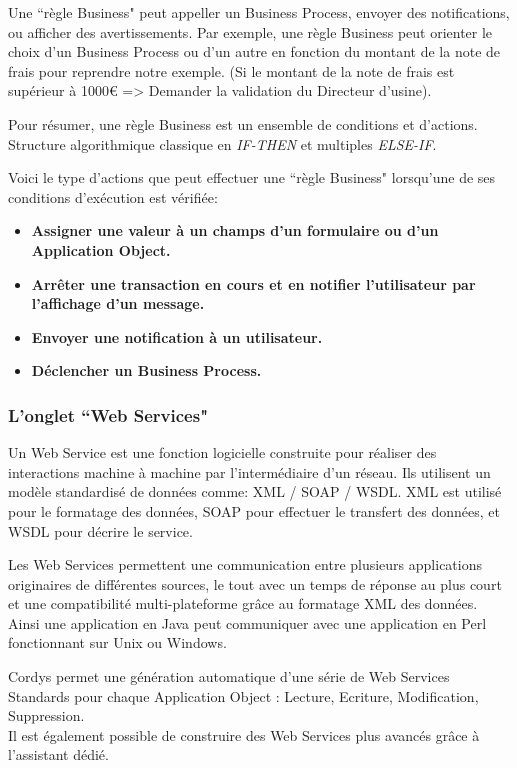 Une ``règle Business" peut appeller un Business Process, envoyer des notifications, ou afficher des avertissements. Par exemple, une règle Business peut orienter le choix d'un Business Process ou d'un autre en fonction du montant de la note de frais pour reprendre notre exemple. (Si le montant de la note de frais est supérieur à 1000€ => Demander la validation du Directeur d'usine). 

Pour résumer, une règle Business est un ensemble de conditions et d'actions. Structure algorithmique classique en \emph{IF-THEN } et multiples \emph{ELSE-IF}.


Voici le type d'actions que peut effectuer une ``règle Business" lorsqu'une de ses conditions d'exécution est vérifiée:

\begin{itemize}\itemsep7pt
	 \item \textbf{Assigner une valeur à un champs d'un formulaire ou d'un Application Object.}
	 	 
	 \item \textbf{Arrêter une transaction en cours et en notifier l'utilisateur par l'affichage d'un message.}
	 
	 \item \textbf{Envoyer une notification à un utilisateur.}
	 
	 \item \textbf{Déclencher un Business Process.} 
\end{itemize}

\subsubsection{L'onglet ``Web Services"}

Un Web Service  est une fonction logicielle construite pour réaliser des interactions machine à machine par l'intermédiaire d'un réseau. Ils utilisent un modèle standardisé de données comme: XML / SOAP / WSDL. XML est utilisé pour le formatage des données, SOAP pour effectuer le transfert des données, et WSDL pour décrire le service.

Les Web Services permettent une communication entre plusieurs applications originaires de différentes sources, le tout avec un temps de réponse au plus court et une compatibilité multi-plateforme grâce au formatage XML des données.\\
Ainsi une application en Java peut communiquer avec une application en Perl fonctionnant sur Unix ou Windows.

Cordys permet une génération automatique d'une série de Web Services Standards pour chaque Application Object : Lecture, Ecriture, Modification, Suppression.\\
Il est également possible de construire des Web Services plus avancés grâce à l'assistant dédié.

